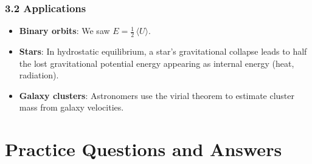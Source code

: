 \subsubsection{3.2 Applications}
\begin{itemize}
  \item \textbf{Binary orbits}: We saw $E = \tfrac12\,\langle U\rangle$.
  \item \textbf{Stars}: In hydrostatic equilibrium, a star’s gravitational collapse leads to half the lost gravitational potential energy appearing as internal energy (heat, radiation).
  \item \textbf{Galaxy clusters}: Astronomers use the virial theorem to estimate cluster mass from galaxy velocities.
\end{itemize}

\section{Practice Questions and Answers}

